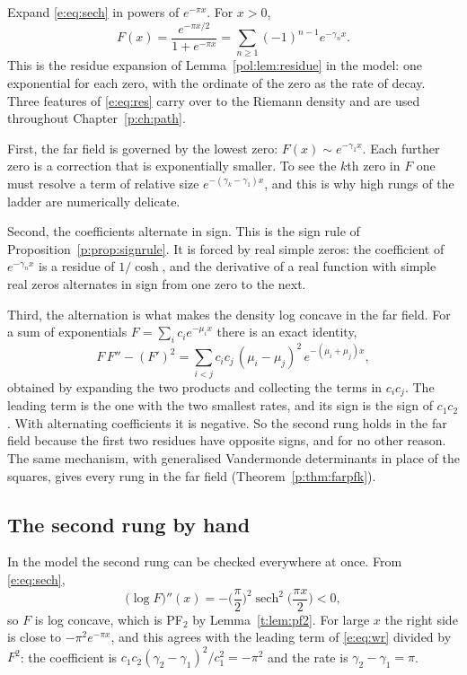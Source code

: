Expand \eqref{e:eq:sech} in powers of $e^{-\pi x}$. For $x>0$,
\begin{equation}\label{e:eq:res}
F(x)=\frac{e^{-\pi x/2}}{1+e^{-\pi x}}=\sum_{n\ge1}(-1)^{n-1}e^{-\gamma_nx}.
\end{equation}
This is the residue expansion of Lemma~\ref{pol:lem:residue} in the model: one exponential for each zero, with the ordinate of the zero as the rate of decay. Three features of \eqref{e:eq:res} carry over to the Riemann density and are used throughout Chapter~\ref{p:ch:path}.

First, the far field is governed by the lowest zero: $F(x)\sim e^{-\gamma_1x}$. Each further zero is a correction that is exponentially smaller. To see the $k$th zero in $F$ one must resolve a term of relative size $e^{-(\gamma_k-\gamma_1)x}$, and this is why high rungs of the ladder are numerically delicate.

Second, the coefficients alternate in sign. This is the sign rule of Proposition~\ref{p:prop:signrule}. It is forced by real simple zeros: the coefficient of $e^{-\gamma_nx}$ is a residue of $1/\cosh$, and the derivative of a real function with simple real zeros alternates in sign from one zero to the next.

Third, the alternation is what makes the density log concave in the far field. For a sum of exponentials $F=\sum_ic_ie^{-\mu_ix}$ there is an exact identity,
\begin{equation}\label{e:eq:wr}
F\,F''-(F')^2=\sum_{i<j}c_ic_j\,(\mu_i-\mu_j)^2\,e^{-(\mu_i+\mu_j)x},
\end{equation}
obtained by expanding the two products and collecting the terms in $c_ic_j$. The leading term is the one with the two smallest rates, and its sign is the sign of $c_1c_2$. With alternating coefficients it is negative. So the second rung holds in the far field because the first two residues have opposite signs, and for no other reason. The same mechanism, with generalised Vandermonde determinants in place of the squares, gives every rung in the far field (Theorem~\ref{p:thm:farpfk}).

\subsection{The second rung by hand}

In the model the second rung can be checked everywhere at once. From \eqref{e:eq:sech},
\begin{equation}\label{e:eq:logconc}
\big(\log F\big)''(x)=-\Big(\frac\pi2\Big)^2\operatorname{sech}^2\Big(\frac{\pi x}{2}\Big)<0 ,
\end{equation}
so $F$ is log concave, which is PF$_2$ by Lemma~\ref{t:lem:pf2}. For large $x$ the right side is close to $-\pi^2e^{-\pi x}$, and this agrees with the leading term of \eqref{e:eq:wr} divided by $F^2$: the coefficient is $c_1c_2(\gamma_2-\gamma_1)^2/c_1^2=-\pi^2$ and the rate is $\gamma_2-\gamma_1=\pi$.


